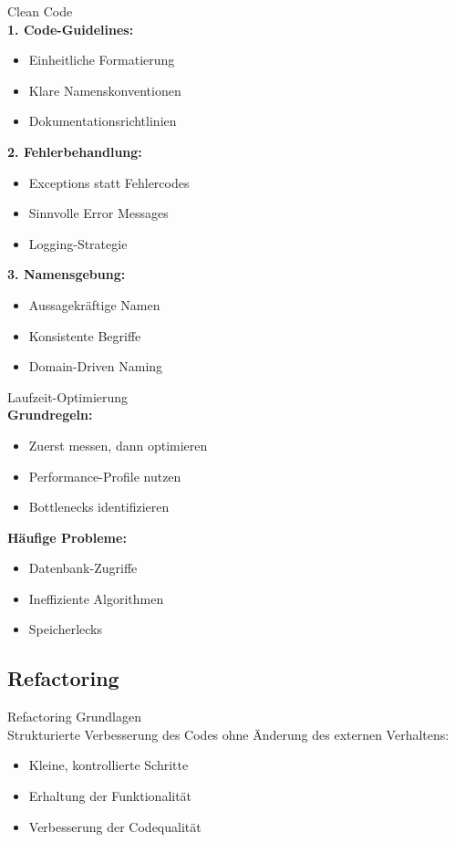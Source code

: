 \begin{KR}{Clean Code}\\
\textbf{1. Code-Guidelines:}
\begin{itemize}
    \item Einheitliche Formatierung
    \item Klare Namenskonventionen
    \item Dokumentationsrichtlinien
\end{itemize}

\textbf{2. Fehlerbehandlung:}
\begin{itemize}
    \item Exceptions statt Fehlercodes
    \item Sinnvolle Error Messages
    \item Logging-Strategie
\end{itemize}

\textbf{3. Namensgebung:}
\begin{itemize}
    \item Aussagekräftige Namen
    \item Konsistente Begriffe
    \item Domain-Driven Naming
\end{itemize}
\end{KR}

\begin{concept}{Laufzeit-Optimierung}\\
\textbf{Grundregeln:}
\begin{itemize}
    \item Zuerst messen, dann optimieren
    \item Performance-Profile nutzen
    \item Bottlenecks identifizieren
\end{itemize}

\textbf{Häufige Probleme:}
\begin{itemize}
    \item Datenbank-Zugriffe
    \item Ineffiziente Algorithmen
    \item Speicherlecks
\end{itemize}
\end{concept}

\subsection{Refactoring}

\begin{definition}{Refactoring Grundlagen}\\
Strukturierte Verbesserung des Codes ohne Änderung des externen Verhaltens:
\begin{itemize}
    \item Kleine, kontrollierte Schritte
    \item Erhaltung der Funktionalität
    \item Verbesserung der Codequalität
\end{itemize}
\end{definition}

